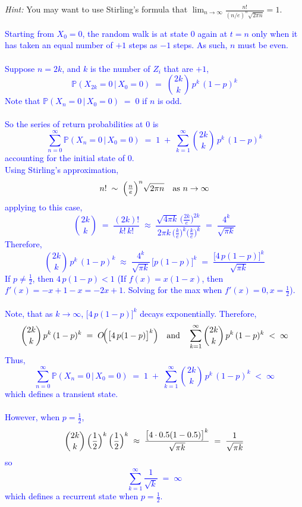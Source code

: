\documentclass{article}
\begin{document}
    \textit{Hint:} You may want to use Stirling’s formula that $\lim_{n \to \infty} \frac{n!}{(n/e)^n \sqrt{2\pi n}} = 1$.


    \textcolor{blue}{
Starting from \(X_0 = 0\), the random walk is at state \(0\) again at \(t=n\) only when it has taken an equal number of \(+1\) steps as \(-1\) steps. As such, \(n\) must be even. \\ \\ Suppose \(n = 2k\), and \(k\) is the number of \(Z_i\) that are \(+1\),
\[
  \mathbb{P}(X_{2k} = 0 \,\big\vert\, X_0 = 0)
  \;=\;
  \binom{2k}{k}\, p^k\, (1-p)^k
\]
Note that $\mathbb{P}(X_n = 0 \,\big\vert\, X_0 = 0) \;=\; 0$ if $n$ is odd. \\ \\
So the series of return probabilities at \(0\) is
\[
  \sum_{n=0}^\infty \mathbb{P}(X_n = 0 \,\big\vert\, X_0 = 0)
  \;=\;
  1 \;+\; \sum_{k=1}^\infty \binom{2k}{k}\, p^k\, (1-p)^k
\]
accounting for the initial state of 0. \\ Using Stirling's approximation,
\medskip
\noindent
\[
  n! \;\sim\; \Bigl(\tfrac{n}{e}\Bigr)^{n}\sqrt{2\pi n}
  \quad\text{as }n \to \infty
\]
applying to this case,
\[
  \binom{2k}{k}
  \;=\;
  \frac{(2k)!}{k!\,k!}
  \;\approx\;
  \frac{\sqrt{4\pi k}\,\bigl(\tfrac{2k}{e}\bigr)^{2k}}{\,2\pi k\,\bigl(\tfrac{k}{e}\bigr)^{k}\bigl(\tfrac{k}{e}\bigr)^{k}}
  \;=\;
  \frac{4^k}{\sqrt{\pi k}}
\]
Therefore,
\[
  \binom{2k}{k}\,p^k\,(1-p)^k
  \;\approx\;
  \frac{4^k}{\sqrt{\pi k}} \,\bigl[p(1-p)\bigr]^k
  \;=\;
  \frac{\bigl[4\,p(1-p)\bigr]^k}{\sqrt{\pi k}}
\]
\medskip
\noindent
If $p \neq \frac{1}{2}$, then \(4\,p(1-p) < 1\) (If $f(x)=x(1-x)$, then $f'(x)=-x+1-x=-2x+1$. Solving for the max when $f'(x)=0, x=\frac{1}{2}$). \\ \\ 
Note, that as \(k \to \infty\), \(\bigl[4\,p(1-p)\bigr]^k\) decays exponentially. Therefore,
\[
  \binom{2k}{k}\,p^k\,(1-p)^k
  \;=\;
  O\!\Bigl(\bigl[4\,p(1-p)\bigr]^k\Bigr)
  \quad
  \text{and}
  \quad
  \sum_{k=1}^{\infty} \binom{2k}{k}\,p^k\,(1-p)^k
  \;<\;\infty
\]
Thus,
\[
  \sum_{n=0}^\infty \mathbb{P}(X_n = 0 \,\big\vert\, X_0 = 0)
  \;=\;
  1 \;+\;
  \sum_{k=1}^{\infty}
  \binom{2k}{k}\, p^k\,(1-p)^k
  \;<\;
  \infty
\]
which defines a transient state. \\ \\ 
\medskip
\noindent
However, when \(p = \frac{1}{2}\),
\[
  \binom{2k}{k}\,\Bigl(\frac12\Bigr)^k\,\Bigl(\frac12\Bigr)^k
  \;\approx\;
    \frac{\bigl[4\cdot 0.5(1-0.5)\bigr]^k}{\sqrt{\pi k}}
  \;=\;
  \frac{1}{\sqrt{\pi k}}
\]
so
\[
  \sum_{k=1}^\infty \frac{1}{\sqrt{k}}
  \;=\;
  \infty
\]
which defines a recurrent state when $p=\frac12$. }
\end{document}
